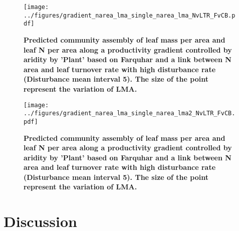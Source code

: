 \documentclass[a4paper,11pt]{article}
\begin{document}
\begin{figure}[ht]
\centering
\texttt{[image: ../figures/gradient\_narea\_lma\_single\_narea\_lma\_NvLTR\_FvCB.pdf]}
\caption{\textbf{Predicted community assembly of leaf mass per area and leaf N per area along a productivity gradient controlled by aridity by 'Plant' based on Farquhar and a link between N area and leaf turnover rate with high disturbance rate (Disturbance mean interval 5). The size of the point represent the variation of LMA.}
\label{fig:lma_nareaFh}}
\end{figure}

\begin{figure}[ht]
\centering
\texttt{[image: ../figures/gradient\_narea\_lma\_single\_narea\_lma2\_NvLTR\_FvCB.pdf]}
\caption{\textbf{Predicted community assembly of leaf mass per area and leaf N per area along a productivity gradient controlled by aridity by 'Plant' based on Farquhar and a link between N area and leaf turnover rate with high disturbance rate (Disturbance mean interval 5). The size of the point represent the variation of LMA.}
\label{fig:lma_nareaFh2}}
\end{figure}



\clearpage

\section{Discussion}
\end{document}
